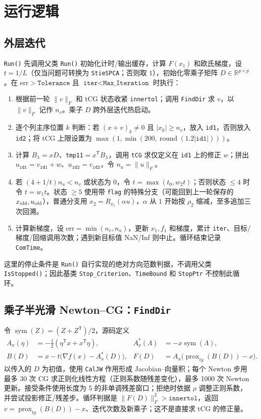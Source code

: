 \documentclass[a4paper,10pt]{article}
\newcommand{\code}[1]{\texttt{#1}}
\begin{document}
\section{运行逻辑}
\subsection{外层迭代}
\code{Run()} 先调用父类 \code{Run()} 初始化计时/输出缓存，计算 $F(x_1)$ 和欧氏梯度，设 $t=1/L$（仅当问题可转换为 \code{StieSPCA}；否则取 $1$），初始化零乘子矩阵 $D\in\mathbb R^{p\times p}$。在 $\mathrm{err}>\code{Tolerance}$ 且 $\code{iter}<\code{Max\_Iteration}$ 时执行：
\begin{enumerate}
\item 根据前一轮 $\|v\|_F$ 和 tCG 状态收紧 \code{innertol}；调用 \code{FindDir} 求 $v$，以 $\|v\|_F$ 记作 $n_v$。乘子 $D$ 跨外层迭代热启动。
\item 逐个列主序位置 $k$ 判断：若 $(x+v)_k\neq0$ 且 $|x_k|\geq n_v$，放入 \code{id1}，否则放入 \code{id2}；将 tCG 上限设置为 $\max(1,\min(200,\operatorname{round}(1.2|\code{id1}|)))$。
\item 计算 $B_\lambda=xD$、\code{tmp11}$=x^{\mathsf T}B_\lambda$，调用 \code{tCG} 求仅定义在 \code{id1} 上的修正 $w$；拼出 $u_{\code{id1}}=v_{\code{id1}}+w$、$u_{\code{id2}}=v_{\code{id2}}$，令 $n_u=\|u\|_F$。
\item 若 $(4+1/t)n_u<n_v$ 或状态为 $0$，令 $t=\max(t_0,w_2t)$；否则状态 $\leq4$ 时令 $t=w_1t$。状态 $\geq5$ 使用带 \code{flag} 的特殊分支（可能回到上一轮保存的 $x_{\rm old},u_{\rm old}$），普通分支用 $x_2=R_{x_1}(\alpha u)$，$\alpha$ 从 $1$ 开始按 $\rho_2$ 缩减，至多追加三次回溯。
\item 计算新梯度，设 $\mathrm{err}=\min(n_v,n_u)$，更新 $x_1,f_1$ 和梯度，累计 \code{iter}、目标/梯度/回缩调用次数；遇到新目标值 NaN/Inf 则中止。循环结束记录 \code{ComTime}。
\end{enumerate}
这里的停止条件是 \code{Run()} 自行实现的绝对方向范数判据，不调用父类 \code{IsStopped()}；因此基类 \code{Stop\_Criterion}、\code{TimeBound} 和 \code{StopPtr} 不控制此循环。

\subsection{乘子半光滑 Newton--CG：\code{FindDir}}
令 $\operatorname{sym}(Z)=(Z+Z^{\mathsf T})/2$，源码定义
\begin{align}
 A_x(\eta)&=-\tfrac12(\eta^{\mathsf T}x+x^{\mathsf T}\eta),
 & A_x^*(\Lambda)&=-x\operatorname{sym}(\Lambda),\\
 B(D)&=x-t\bigl(\nabla f(x)-A_x^*(D)\bigr),
 & F(D)&=A_x\bigl(\operatorname{prox}_{tg}(B(D))-x\bigr).
\end{align}
以传入的 $D$ 为初值，使用 \code{CalJW} 作用形成 Jacobian--向量积；每个 Newton 步用最多 30 次 CG 求正则化线性方程（正则系数随残差变化），最多 1000 次 Newton 更新。接受条件使用长度为 5 的非单调残差窗口；拒绝时依据 $\rho$ 调整正则系数，并尝试投影修正/残差步。循环判据是 $\|F(D)\|_F^2>\code{innertol}$，返回 $v=\operatorname{prox}_{tg}(B(D))-x$、迭代次数及新乘子；这不是直接求 tCG 的修正量。
\end{document}
